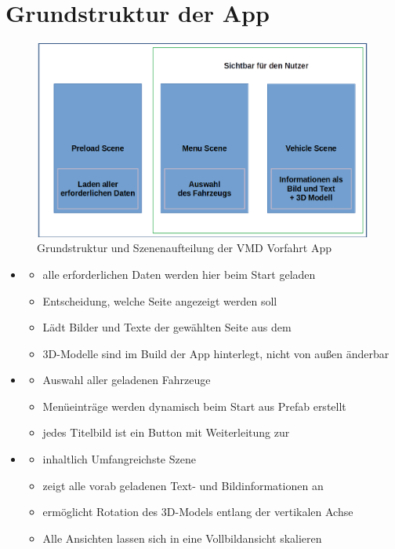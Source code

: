 \chapter{Grundstruktur der App}
\label{cha:basicstructure}
%
\begin{figure}[htp]
	\centering
	\includegraphics[width=.8\linewidth]{img/basic_structure}
	\caption[structure]{Grundstruktur und Szenenaufteilung der VMD Vorfahrt App}
	\label{fig:basicstructure}
\end{figure}

\begin{itemize}
	\item \pres
	\begin{itemize}
		\item alle erforderlichen Daten werden hier beim Start geladen
		\item Entscheidung, welche Seite angezeigt werden soll
		\item Lädt Bilder und Texte der gewählten Seite aus dem \sad
		\item 3D-Modelle sind im Build der App hinterlegt, nicht von außen änderbar
	\end{itemize}
	\item \mms
	\begin{itemize}
		\item Auswahl aller geladenen Fahrzeuge
		\item Menüeinträge werden dynamisch beim Start aus Prefab erstellt
		\item jedes Titelbild ist ein Button mit Weiterleitung zur \vhs
	\end{itemize}
	\item \vhs
	\begin{itemize}
		\item inhaltlich Umfangreichste Szene
		\item zeigt alle vorab geladenen Text- und Bildinformationen an
		\item ermöglicht Rotation des 3D-Models entlang der vertikalen Achse
		\item Alle Ansichten lassen sich in eine Vollbildansicht skalieren
	\end{itemize}
\end{itemize}
%
